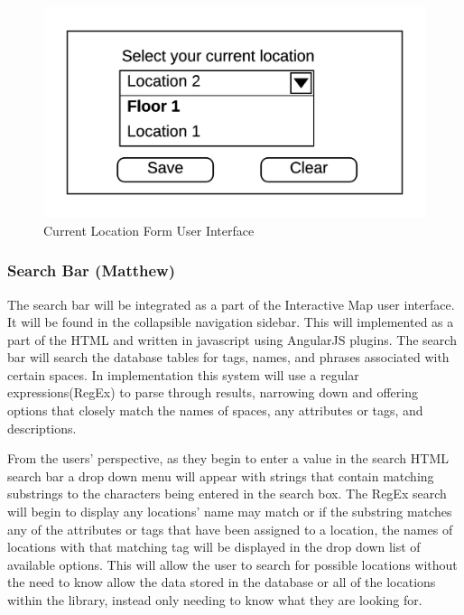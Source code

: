 \documentclass[letterpaper,10pt,titlepage, onecolumn, compsoc]{IEEEtran}
\begin{document}
\begin{figure}[h!]
\centering
\includegraphics[cale=1.0\textwidth,natwidth=1200,natheight=660]{images/current-location-form.png}
\caption{Current Location Form User Interface}
\label{fig:method}
\end{figure}

\subsubsection{Search Bar (Matthew)}
The search bar will be integrated as a part of the Interactive Map user interface. It will be found in the collapsible navigation sidebar. This will implemented as a part of the HTML and written in javascript using AngularJS plugins. The search bar will search the database tables for tags, names, and phrases associated with certain spaces. In implementation this system will use a regular expressions(RegEx) to parse through results, narrowing  down and offering options that closely match the names of spaces, any attributes or tags,  and descriptions. 

From the users' perspective, as they begin to enter a value in the search HTML search bar a drop down menu will appear with strings that contain matching substrings to the characters being entered in the search box. The RegEx search will begin to display any locations' name may match or if the substring matches any of the attributes or tags that have been assigned to a location, the names of locations with that matching tag will be displayed in the drop down list of available options. This will allow the user to search for possible locations without the need to know allow the data stored in the database or all of the locations within the library, instead only needing to know what they are looking for.
\end{document}
